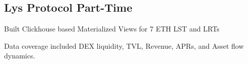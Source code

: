
\subsection*{Lys Protocol \hfill Part-Time} 
    \begin{zitemize}
        \item Built Clickhouse based Materialized Views for 7 ETH LST and LRTs
        \item Data coverage included DEX liquidity, TVL, Revenue, APRs, and Asset flow dynamics.
    \end{zitemize}
    
